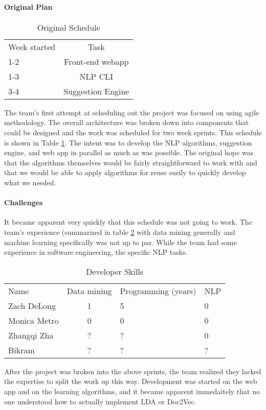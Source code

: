 
\paragraph{Original Plan}
\begin{table}[h]
    \caption{Original Schedule}
    \begin{tabular}{ l c }
    Week started & Task \\
    1-2 & Front-end webapp  \\
    1-3 & NLP CLI  \\
    3-4 & Suggestion Engine 
    \end{tabular} \label{sec:devi-from-init-pln:original-timeline}
\end{table}

The team's first attempt at scheduling out the project was focused on
using agile methodology.  
The overall architecture was broken down into components that could be
designed and the work was scheduled for two week sprints.
This schedule is shown in Table
\ref{sec:devi-from-init-pln:original-timeline}.
The intent was to develop the NLP algorithms, suggestion engine, and
web app in parallel as much as was possible.
The original hope was that the algorithms themselves would be fairly
straightforward to work with and that we would be able to apply
algorithms for reuse easily to quickly develop what we needed.

\paragraph{Challenges}
It became apparent very quickly that this schedule was not going to
work.
The team's experience (summarized in table
\ref{sec:devi-from-init-pln:skillsets} with data mining generally and
machine learning specifically was not up to par.
While the team had some experience in software engineering, the
specific NLP tasks.

\begin{table}[h]
    \caption{Developer Skills}
    \begin{tabular}{ l c l l}
    Name & Data mining & Programming (years) & NLP\\
    Zach DeLong & 1 & 5 & 0 \\
    Monica Metro &  0 & 0 & 0 \\
    Zhangqi Zha & ? & ? & 0\\
    Bikram & ? & ? & ?  
    \end{tabular} \label{sec:devi-from-init-pln:skillsets}
\end{table}

After the project was broken into the above sprints, the team realized
they lacked the expertise to split the work up this way.
Development was started on the web app and on the learning algorithms, and it
became apparent immedaitely that no one understood how to actually
implement LDA or Doc2Vec.

